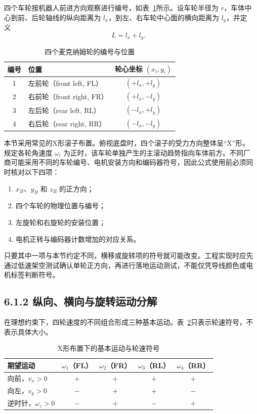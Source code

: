 \documentclass[UTF8,zihao=-4]{ctexart}
\begin{document}
四个车轮按机器人前进方向观察进行编号，如表~\ref{tab:wheel-numbering}所示。设车轮半径为 $r$，车体中心到前、后轮轴线的纵向距离为 $l_x$，到左、右车轮中心面的横向距离为 $l_y$，并定义
\begin{equation}
  L = l_x + l_y.
  \label{eq:lever-arm}
\end{equation}

\begin{table}[htbp]
  \centering
  \caption{四个麦克纳姆轮的编号与位置}
  \label{tab:wheel-numbering}
  \begin{tabular}{clc}
    \toprule
    编号 & 位置 & 轮心坐标 $(x_i,y_i)$ \\
    \midrule
    1 & 左前轮（front left, FL）  & $(+l_x,+l_y)$ \\
    2 & 右前轮（front right, FR） & $(+l_x,-l_y)$ \\
    3 & 左后轮（rear left, RL）   & $(-l_x,+l_y)$ \\
    4 & 右后轮（rear right, RR）  & $(-l_x,-l_y)$ \\
    \bottomrule
  \end{tabular}
\end{table}

本节采用常见的X形滚子布置。俯视底盘时，四个滚子的受力方向整体呈“X”形。规定各轮角速度 $\omega_i$ 为正时，该车轮单独产生的主滚动趋势指向车体前方。不同厂商可能采用不同的车轮编号、电机安装方向和编码器符号，因此公式使用前必须同时核对以下四项：
\begin{enumerate}
  \item $x_B$、$y_B$ 和 $z_B$ 的正方向；
  \item 四个车轮的物理位置与编号；
  \item 左旋轮和右旋轮的安装位置；
  \item 电机正转与编码器计数增加的对应关系。
\end{enumerate}

只要其中一项与本节约定不同，横移或旋转项的符号就可能改变。工程实现时应先通过低速架空测试确认单轮正方向，再进行落地运动测试，不能仅凭导线颜色或电机标签判断符号。

\subsection*{6.1.2 纵向、横向与旋转运动分解}

在理想约束下，四轮速度的不同组合形成三种基本运动。表~\ref{tab:basic-motion}只表示轮速符号，不表示具体大小。

\begin{table}[htbp]
  \centering
  \caption{X形布置下的基本运动与轮速符号}
  \label{tab:basic-motion}
  \begin{tabular}{lcccc}
    \toprule
    期望运动 & $\omega_1$（FL） & $\omega_2$（FR） & $\omega_3$（RL） & $\omega_4$（RR） \\
    \midrule
    向前，$v_x>0$       & $+$ & $+$ & $+$ & $+$ \\
    向左，$v_y>0$       & $-$ & $+$ & $+$ & $-$ \\
    逆时针，$\omega_z>0$ & $-$ & $+$ & $-$ & $+$ \\
    \bottomrule
  \end{tabular}
\end{table}
\end{document}
